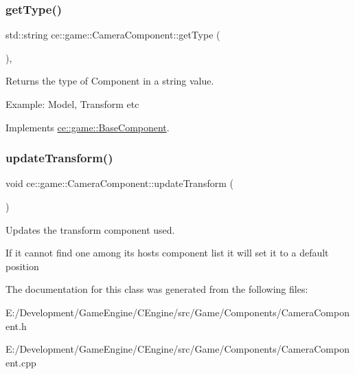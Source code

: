\subsubsection{\texorpdfstring{get\+Type()}{getType()}}
{\footnotesize\ttfamily std\+::string ce\+::game\+::\+Camera\+Component\+::get\+Type (\begin{DoxyParamCaption}{ }\end{DoxyParamCaption})\hspace{0.3cm}{\ttfamily [override]}, {\ttfamily [virtual]}}



Returns the type of Component in a string value. 

Example\+: Model, Transform etc 

Implements \hyperlink{classce_1_1game_1_1_base_component_a1022b55c1926a019a2b3a71fb6b9150e}{ce\+::game\+::\+Base\+Component}.

\mbox{\label{classce_1_1game_1_1_camera_component_a8c29ab156769194cc83908467b37beec}} 
\subsubsection{\texorpdfstring{update\+Transform()}{updateTransform()}}
{\footnotesize\ttfamily void ce\+::game\+::\+Camera\+Component\+::update\+Transform (\begin{DoxyParamCaption}{ }\end{DoxyParamCaption})}



Updates the transform component used. 

If it cannot find one among it\textquotesingle{}s hosts component list it will set it to a default position 

The documentation for this class was generated from the following files\+:\begin{DoxyCompactItemize}
\item 
E\+:/\+Development/\+Game\+Engine/\+C\+Engine/src/\+Game/\+Components/Camera\+Component.\+h\item 
E\+:/\+Development/\+Game\+Engine/\+C\+Engine/src/\+Game/\+Components/Camera\+Component.\+cpp\end{DoxyCompactItemize}
